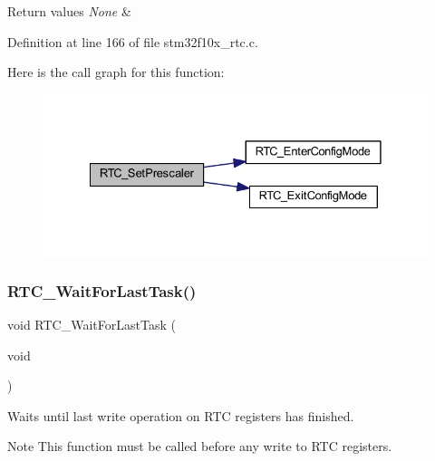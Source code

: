 \begin{DoxyRetVals}{Return values}
{\em None} & \\
\hline
\end{DoxyRetVals}


Definition at line 166 of file stm32f10x\+\_\+rtc.\+c.

Here is the call graph for this function\+:
\nopagebreak
\begin{figure}[H]
\begin{center}
\leavevmode
\includegraphics[width=328pt]{group___r_t_c___exported___functions_gaf76be6071d1ba65b009e0791069e602c_cgraph}
\end{center}
\end{figure}
\mbox{\label{group___r_t_c___exported___functions_gaa0a406ef860d5231748c5f0d82673036}} 
\subsubsection{\texorpdfstring{R\+T\+C\+\_\+\+Wait\+For\+Last\+Task()}{RTC\_WaitForLastTask()}}
{\footnotesize\ttfamily void R\+T\+C\+\_\+\+Wait\+For\+Last\+Task (\begin{DoxyParamCaption}\item[{void}]{ }\end{DoxyParamCaption})}



Waits until last write operation on R\+TC registers has finished. 

\begin{DoxyNote}{Note}
This function must be called before any write to R\+TC registers. 
\end{DoxyNote}

